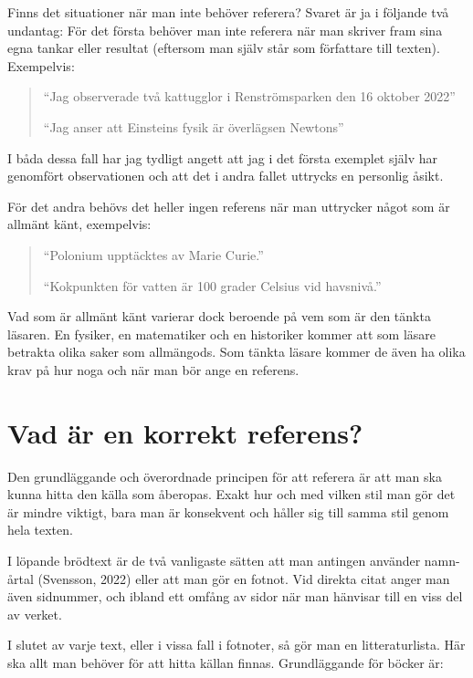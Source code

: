 \documentclass[11pt,a5paper,footinclude=true,headinclude=true]{scrbook} %
\begin{document}
{\noindent Finns det situationer när man inte behöver referera? Svaret är ja i följande två undantag: För det första behöver man inte referera när man skriver fram sina egna tankar eller resultat (eftersom man själv står som författare till texten). Exempelvis:

\begin{quote}
``Jag observerade två kattugglor i Renströmsparken den 16 oktober 2022''

``Jag anser att Einsteins fysik är överlägsen Newtons''
\end{quote}

\noindent I båda dessa fall har jag tydligt angett att jag i det första exemplet själv har genomfört observationen och att det i andra fallet uttrycks en personlig åsikt. 

För det andra behövs det heller ingen referens när man uttrycker något som är allmänt känt, exempelvis:

\begin{quote}
``Polonium upptäcktes av Marie Curie.''

``Kokpunkten för vatten är 100 grader Celsius vid havsnivå.''
\end{quote}

\noindent Vad som är allmänt känt varierar dock beroende på vem som är den tänkta läsaren. En fysiker, en matematiker och en historiker kommer att som läsare betrakta olika saker som allmängods. Som tänkta läsare kommer de även ha olika krav på hur noga och när man bör ange en referens. 

\section{Vad är en korrekt referens?}

Den grundläggande och överordnade principen för att referera är att man ska kunna hitta den källa som åberopas. Exakt hur och med vilken stil man gör det är mindre viktigt, bara man är konsekvent och håller sig till samma stil genom hela texten. 

I löpande brödtext är de två vanligaste sätten att man antingen använder namn-årtal (Svensson, 2022) eller att man gör en fotnot. Vid direkta citat anger man även sidnummer, och ibland ett omfång av sidor när man hänvisar till en viss del av verket. 

I slutet av varje text, eller i vissa fall i fotnoter, så gör man en litteraturlista. Här ska allt man behöver för att hitta källan finnas. Grundläggande för böcker är:

}
\end{document}
